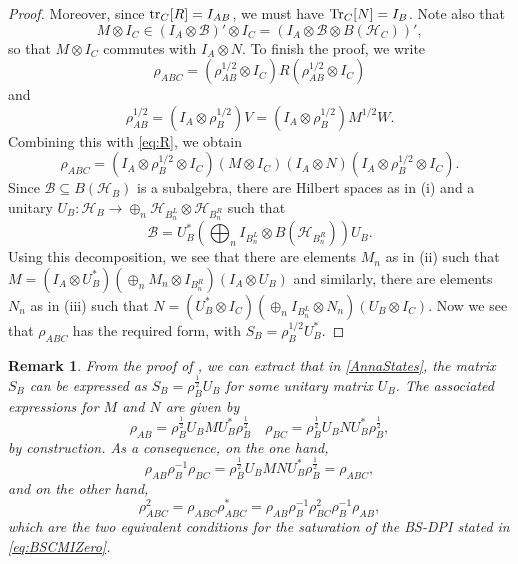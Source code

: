 \documentclass[11pt]{article}
\theoremstyle{newdefinition}
\theoremstyle{newplain}
\newtheorem{remark}[definition]{Remark}
\theoremstyle{myplain}
\DeclareMathOperator{\1}{\mathds{1}}
\begin{document}
{\begin{proof}
Moreover, since $\tr_C[R]=I_{AB}$, we must have
$\Tr_C[N]=I_B$. 
 Note also that 
\[
 M\otimes I_C\in (I_A\otimes \mathcal{B})'\otimes I_C=(I_A\otimes \mathcal{B}\otimes
 B(\mathcal{H}_C))',
\]
so that $M\otimes I_C$ commutes with $I_A\otimes N$. To finish the proof, we write
\[
\rho_{ABC}=(\rho^{1/2}_{AB}\otimes I_C)R(\rho^{1/2}_{AB}\otimes I_C)
\]
and 
\[
\rho_{AB}^{1/2}=(I_A\otimes \rho_B^{1/2})V=(I_A\otimes \rho_B^{1/2})M^{1/2}W.
\]
Combining this with \eqref{eq:R}, we obtain
\[
\rho_{ABC}=(I_A\otimes \rho_B^{1/2}\otimes I_C)(M\otimes I_C)(I_A\otimes N)(I_A\otimes
\rho_B^{1/2}\otimes I_C).
\]
Since $\mathcal {B}\subseteq B(\mathcal{H}_B)$ is a subalgebra, there are Hilbert spaces as in (i) and a
unitary $U_B:\mathcal {H}_B\to \oplus_n \mathcal {H}_{B^L_n}\otimes \mathcal{H}_{B^R_n}$ such that
\[
\mathcal{B}=U^*_B\left(\bigoplus_n I_{B^L_n}\otimes B(\mathcal{H}_{B^R_n})\right) U_B.
\]
Using this decomposition, we see that there are elements $M_n$ as in (ii) such that 
$M=(I_A\otimes U^*_B)(\oplus_n M_n\otimes I_{B^R_n})(I_A\otimes U_B)$ and similarly, there
are elements $N_n$ as in (iii) such that $N=(U_B^*\otimes I_C)(\oplus_n I_{B^L_n}\otimes
N_n)(U_B\otimes I_C)$. Now we see that $\rho_{ABC}$ has the required form, with
$S_B=\rho^{1/2}_BU^*_B$.


\end{proof}

}







\begin{remark} \label{rem:from-decomposition-to-map}
From the proof of 
, we can extract that in \eqref{AnnaStates}, the matrix $S_B$ can be expressed as $S_B=\rho_B^{\frac{1}{2}}U_B$ for some unitary matrix $U_B$. The associated expressions for $M$ and $N$ are given by
\begin{equation}
   \rho_{AB}=\rho_B^{\frac{1}{2}}U_BMU_B^*\rho_B^{\frac{1}{2}} \quad \rho_{BC}=\rho_B^{\frac{1}{2}}U_BNU_B^*\rho_B^{\frac{1}{2}},
\end{equation}
by construction. As a consequence, on the one hand,
\begin{equation}
    \rho_{AB}\rho_{B}^{-1}\rho_{BC}=\rho_B^{\frac{1}{2}}U_BM N U_B^*\rho_B^{\frac{1}{2}}=\rho_{ABC},
\end{equation}
and on the other hand,
\begin{equation}
\rho_{ABC}^2=\rho_{ABC}\rho_{ABC}^*=\rho_{AB}\rho_{B}^{-1}\rho_{BC}^2\rho_B^{-1}\rho_{AB},
\end{equation}
which are the two equivalent conditions for the saturation of the BS-DPI stated in \eqref{eq:BSCMIZero}.
\end{remark}
\end{document}

